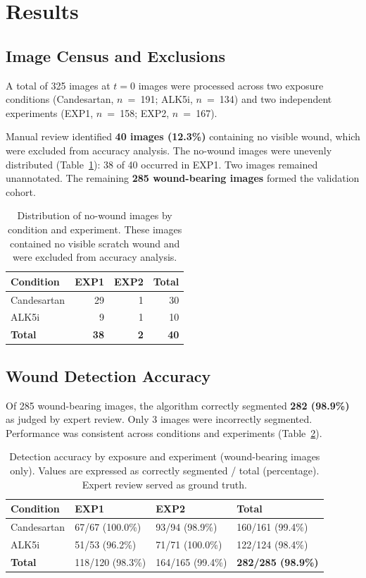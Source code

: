 \section{Results}

\subsection{Image Census and Exclusions}

A total of 325 images at $t = 0$ images were processed across two exposure conditions
(Candesartan, $n$~=~191; ALK5i, $n$~=~134) and two independent experiments
(EXP1, $n$~=~158; EXP2, $n$~=~167).

Manual review identified \textbf{40 images (12.3\%)} containing no visible wound,
which were excluded from accuracy analysis.
The no-wound images were unevenly distributed (Table~\ref{tab:nowound-distribution}):
38 of 40 occurred in EXP1.
Two images remained unannotated.
The remaining \textbf{285 wound-bearing images} formed the validation cohort.

\begin{table}[htbp]
\centering
\caption{Distribution of no-wound images by condition and experiment.
  These images contained no visible scratch wound and were excluded from accuracy analysis.}
\label{tab:nowound-distribution}
\begin{tabular}{lrrr}
\toprule
Condition & EXP1 & EXP2 & Total \\
\midrule
Candesartan & 29 & 1 & 30 \\
ALK5i       &  9 & 1 & 10 \\
\midrule
\textbf{Total} & \textbf{38} & \textbf{2} & \textbf{40} \\
\bottomrule
\end{tabular}
\end{table}

\subsection{Wound Detection Accuracy}

Of 285 wound-bearing images, the algorithm correctly segmented \textbf{282 (98.9\%)} as judged
by expert review.
Only 3 images were incorrectly segmented.
Performance was consistent across conditions and experiments (Table~\ref{tab:accuracy}).

\begin{table}[htbp]
\centering
\caption{Detection accuracy by exposure and experiment (wound-bearing images only).
  Values are expressed as correctly segmented / total (percentage).
  Expert review served as ground truth.}
\label{tab:accuracy}
\begin{tabular}{llll}
\toprule
Condition & EXP1 & EXP2 & Total \\
\midrule
Candesartan & 67/67 (100.0\%) & 93/94 (98.9\%) & 160/161 (99.4\%) \\
ALK5i       & 51/53 (96.2\%)  & 71/71 (100.0\%) & 122/124 (98.4\%) \\
\midrule
\textbf{Total} & 118/120 (98.3\%) & 164/165 (99.4\%) & \textbf{282/285 (98.9\%)} \\
\bottomrule
\end{tabular}
\end{table}

